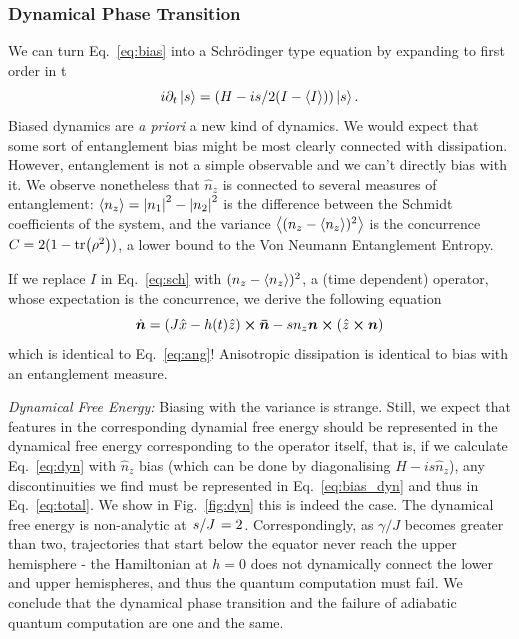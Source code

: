 \documentclass{article}
\let\vec\bm
\begin{document}
\subsubsection{Dynamical Phase Transition}
We can turn Eq.~\ref{eq:bias} into a Schr\"odinger type equation by expanding to first order in t
\begin{equation}
    i\partial_t\ket{s} = (H-is/2(I-\ev{I}))\ket{s}.\label{eq:sch}
\end{equation}
Biased dynamics are \emph{a priori} a new kind of dynamics.
We would expect that some sort of entanglement bias might be most clearly connected with dissipation.
However, entanglement is not a simple observable and we can't directly bias with it. 
We observe nonetheless that $\hat{n}_z$ is connected to several measures of entanglement: $\ev{n_z} = \abs{n_1}^2-\abs{n_2}^2$ is the difference between the Schmidt coefficients of the system, and the variance $\ev{(n_z-\ev{n_z})^2}$ is the concurrence $C = 2(1-\tr(\rho^2))$, a lower bound to the Von Neumann Entanglement Entropy. 

If we replace $I$ in Eq.~\ref{eq:sch} with $(n_z-\ev{n_z})^2$, a (time dependent) operator, whose expectation is the concurrence, we derive the following equation
\begin{equation}
    \dot{\vec{n}} = (J \hat{x} - h(t) \hat{z}) \cross \vec{\bar{n}} - s n_z \vec{n} \cross(\hat{z} \cross\vec{n})\label{eq:bias_dyn}
\end{equation}
which is identical to Eq.~\ref{eq:ang}! Anisotropic dissipation is identical to bias with an entanglement measure.

{\it Dynamical Free Energy: } Biasing with the variance is strange. 
Still, we expect that features in the corresponding dynamial free energy should be represented in the dynamical free energy corresponding to the operator itself, that is, if we calculate Eq.~\ref{eq:dyn} with $\hat{n}_z$ bias (which can be done by diagonalising $H-is\hat{n}_z$), any discontinuities we find must be represented in Eq.~\ref{eq:bias_dyn} and thus in Eq.~\ref{eq:total}.
We show in Fig.~\ref{fig:dyn} this is indeed the case. 
The dynamical free energy is non-analytic at $\flatfrac{s}{J} = 2$. 
Correspondingly, as $\gamma/J$ becomes greater than two, trajectories that start below the equator never reach the upper hemisphere - the Hamiltonian at $h=0$ does not dynamically connect the lower and upper hemispheres, and thus the quantum computation must fail. 
We conclude that the dynamical phase transition and the failure of adiabatic quantum computation are one and the same. 
\end{document}
